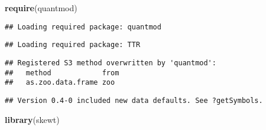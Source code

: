 \documentclass[]{article}
\newenvironment{Shaded}{\begin{snugshade}}{\end{snugshade}}
\newcommand{\ControlFlowTok}[1]{\textcolor[rgb]{0.13,0.29,0.53}{\textbf{#1}}}
\newcommand{\DataTypeTok}[1]{\textcolor[rgb]{0.13,0.29,0.53}{#1}}
\newcommand{\DecValTok}[1]{\textcolor[rgb]{0.00,0.00,0.81}{#1}}
\newcommand{\KeywordTok}[1]{\textcolor[rgb]{0.13,0.29,0.53}{\textbf{#1}}}
\newcommand{\NormalTok}[1]{#1}
\newcommand{\OperatorTok}[1]{\textcolor[rgb]{0.81,0.36,0.00}{\textbf{#1}}}
\newcommand{\OtherTok}[1]{\textcolor[rgb]{0.56,0.35,0.01}{#1}}
\newcommand{\StringTok}[1]{\textcolor[rgb]{0.31,0.60,0.02}{#1}}
\begin{document}
\begin{Shaded}
\begin{Highlighting}[]
\KeywordTok{require}\NormalTok{(quantmod)}
\end{Highlighting}
\end{Shaded}

\begin{verbatim}
## Loading required package: quantmod
\end{verbatim}

\begin{verbatim}
## Loading required package: TTR
\end{verbatim}

\begin{verbatim}
## Registered S3 method overwritten by 'quantmod':
##   method            from
##   as.zoo.data.frame zoo
\end{verbatim}

\begin{verbatim}
## Version 0.4-0 included new data defaults. See ?getSymbols.
\end{verbatim}

\begin{Shaded}
\begin{Highlighting}[]
\KeywordTok{library}\NormalTok{(skewt)}
\end{Highlighting}
\end{Shaded}

\begin{Shaded}
\end{Shaded}
\end{document}
